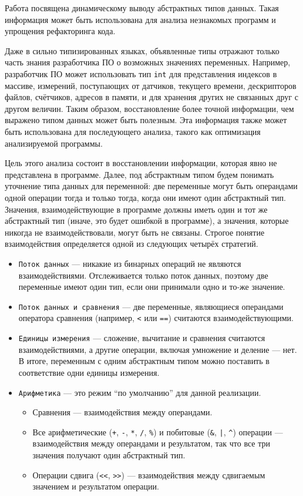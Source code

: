 \documentclass[a4paper,12pt,russian]{article}
\begin{document}
Работа \cite{abstracttypes} посвящена динамическому выводу абстрактных типов данных.
Такая информация может быть использована для анализа незнакомых программ и упрощения рефакторинга кода.

Даже в сильно типизированных языках, объявленные типы отражают только часть знания разработчика ПО о возможных значениях переменных.
Например, разработчик ПО может использовать тип \texttt{int} для представления индексов в массиве, измерений, поступающих от датчиков, текущего времени, дескрипторов файлов, счётчиков, адресов в памяти, и для хранения других не связанных друг с другом величин.
Таким образом, восстановление более точной информации, чем выражено типом данных может быть полезным.
Эта информация также может быть использована для последующего анализа, такого как оптимизация анализируемой программы.

Цель этого анализа состоит в восстановлении информации, которая явно не представлена в программе.
Далее, под абстрактным типом будем понимать уточнение типа данных для переменной: две переменные могут быть операндами одной операции тогда и только тогда, когда они имеют один абстрактный тип.
Значения, взаимодействующие в программе должны иметь один и тот же абстрактный тип (иначе, это будет ошибкой в программе), а значения, которые никогда не взаимодействовали, могут быть не связаны.
Строгое понятие взаимодействия определяется одной из следующих четырёх стратегий.
\begin{itemize}
\item \texttt{Поток данных} --- никакие из бинарных операций не являются взаимодействиями. Отслеживается только поток данных, поэтому две переменные имеют один тип, если они принимали одно и то-же значение.
\item \texttt{Поток данных и сравнения} --- две переменные, являющиеся операндами оператора сравнения (например, \texttt{<} или \texttt{==}) считаются взаимодействующими.
\item \texttt{Единицы измерения} --- сложение, вычитание и сравнения считаются взаимодействиями, а другие операции, включая умножение и деление --- нет. В итоге, переменным с одним абстрактным типом можно поставить в соответствие одни единицы измерения.
\item \texttt{Арифметика} --- это режим ``по умолчанию'' для данной реализации.
  \begin{itemize}
    \item Сравнения --- взаимодействия между операндами.
    \item Все арифметические (\texttt{+}, \texttt{-}, \texttt{*}, \texttt{/}, \texttt{\%}) и побитовые (\texttt{\&}, \texttt{|}, \texttt{\^}) операции --- взаимодействия между операндами и результатом, так что все три значения получают один абстрактный тип.
    \item Операции сдвига (\texttt{<}\texttt{<}, \texttt{>}\texttt{>}) --- взаимодействия между сдвигаемым значением и результатом операции.
  \end{itemize}
\end{itemize}
\end{document}
